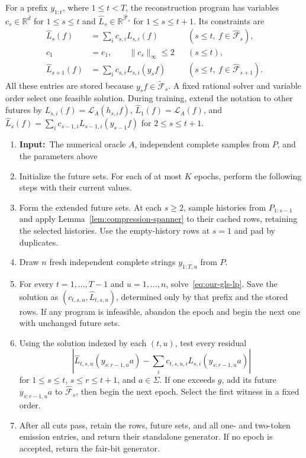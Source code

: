 \documentclass[11pt]{article}
\newenvironment{algorithmic}[1][1]
{\begin{enumerate}[label=\arabic*:,leftmargin=2em,itemsep=3pt]}
{\end{enumerate}}
\newcommand{\Require}{\item[]\textbf{Input:}\ }
\newcommand{\State}{\item}
\theoremstyle{definition}
\theoremstyle{remark}
\begin{document}
For a prefix $y_{1:t}$, where $1\le t<T$, the reconstruction program has variables $c_s\in\mathbb R^{\bar d}$ for $1\le s\le t$ and $\hat L_s\in\mathbb R^{\hat{\mathcal F}_s}$ for $1\le s\le t+1$. Its constraints are
\begin{equation}\label{eq:our-gls-lp}
\begin{aligned}
\hat L_s(f)&=\sum_i c_{s,i}L_{s,i}(f)
  &&(s\le t,\ f\in\hat{\mathcal F}_s),\\
c_1&=e_1,\qquad \|c_s\|_\infty\le2 &&(s\le t),\\
\hat L_{s+1}(f)&=\sum_i c_{s,i}L_{s,i}(y_sf)
  &&(s\le t,\ f\in\hat{\mathcal F}_{s+1}).
\end{aligned}
\end{equation}
All these entries are stored because $y_sf\in\tilde{\mathcal F}_s$. A fixed rational solver and variable order select one feasible solution. During training, extend the notation to other futures by $L_{s,i}(f)=\mathcal L_A(h_{s,i}f)$,
$\hat L_1(f)=\mathcal L_A(f)$, and
$\hat L_s(f)=\sum_i c_{s-1,i}L_{s-1,i}(y_{s-1}f)$ for $2\le s\le t+1$.

\begin{algorithm}[H]
\caption{The robust cached-row learner}\label{alg:gls-explicit}
\begin{algorithmic}[1]
\Require The numerical oracle $A$, independent complete samples from $P$, and the parameters above
\State Initialize the future sets. For each of at most $K$ epochs, perform the following steps with their current values.
\State Form the extended future sets. At each $s\ge2$, sample histories from $P_{1:s-1}$ and apply Lemma~\ref{lem:compression-spanner} to their cached rows, retaining the selected histories. Use the empty-history rows at $s=1$ and pad by duplicates.
\State Draw $n$ fresh independent complete strings $y_{1:T,u}$ from $P$.
\State For every $t=1,\ldots,T-1$ and $u=1,\ldots,n$, solve~\eqref{eq:our-gls-lp}. Save the solution as $(c_{t,s,u},\hat L_{t,s,u})$, determined only by that prefix and the stored rows. If any program is infeasible, abandon the epoch and begin the next one with unchanged future sets.
\State Using the solution indexed by each $(t,u)$, test every residual
\[\left|\hat L_{t,s,u}(y_{s:r-1,u}a)-\sum_i c_{t,s,u,i}L_{s,i}(y_{s:r-1,u}a)\right|\]
for $1\le s\le t$, $s\le r\le t+1$, and $a\in\Sigma$. If one exceeds $g$, add its future $y_{s:r-1,u}a$ to $\hat{\mathcal F}_s$, then begin the next epoch. Select the first witness in a fixed order.
\State After all cuts pass, retain the rows, future sets, and all one- and two-token emission entries, and return their standalone generator. If no epoch is accepted, return the fair-bit generator.
\end{algorithmic}
\end{algorithm}
\end{document}
